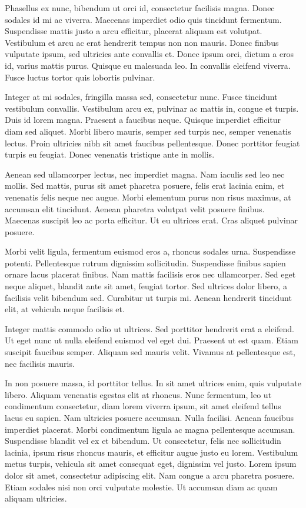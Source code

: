 Phasellus ex nunc, bibendum ut orci id, consectetur facilisis magna. Donec sodales id mi ac viverra. Maecenas imperdiet odio quis tincidunt fermentum. Suspendisse mattis justo a arcu efficitur, placerat aliquam est volutpat. Vestibulum et arcu ac erat hendrerit tempus non non mauris. Donec finibus vulputate ipsum, sed ultricies ante convallis et. Donec ipsum orci, dictum a eros id, varius mattis purus. Quisque eu malesuada leo. In convallis eleifend viverra. Fusce luctus tortor quis lobortis pulvinar.

Integer at mi sodales, fringilla massa sed, consectetur nunc. Fusce tincidunt vestibulum convallis. Vestibulum arcu ex, pulvinar ac mattis in, congue et turpis. Duis id lorem magna. Praesent a faucibus neque. Quisque imperdiet efficitur diam sed aliquet. Morbi libero mauris, semper sed turpis nec, semper venenatis lectus. Proin ultricies nibh sit amet faucibus pellentesque. Donec porttitor feugiat turpis eu feugiat. Donec venenatis tristique ante in mollis.

Aenean sed ullamcorper lectus, nec imperdiet magna. Nam iaculis sed leo nec mollis. Sed mattis, purus sit amet pharetra posuere, felis erat lacinia enim, et venenatis felis neque nec augue. Morbi elementum purus non risus maximus, at accumsan elit tincidunt. Aenean pharetra volutpat velit posuere finibus. Maecenas suscipit leo ac porta efficitur. Ut eu ultrices erat. Cras aliquet pulvinar posuere.

Morbi velit ligula, fermentum euismod eros a, rhoncus sodales urna. Suspendisse potenti. Pellentesque rutrum dignissim sollicitudin. Suspendisse finibus sapien ornare lacus placerat finibus. Nam mattis facilisis eros nec ullamcorper. Sed eget neque aliquet, blandit ante sit amet, feugiat tortor. Sed ultrices dolor libero, a facilisis velit bibendum sed. Curabitur ut turpis mi. Aenean hendrerit tincidunt elit, at vehicula neque facilisis et.

Integer mattis commodo odio ut ultrices. Sed porttitor hendrerit erat a eleifend. Ut eget nunc ut nulla eleifend euismod vel eget dui. Praesent ut est quam. Etiam suscipit faucibus semper. Aliquam sed mauris velit. Vivamus at pellentesque est, nec facilisis mauris.

In non posuere massa, id porttitor tellus. In sit amet ultrices enim, quis vulputate libero. Aliquam venenatis egestas elit at rhoncus. Nunc fermentum, leo ut condimentum consectetur, diam lorem viverra ipsum, sit amet eleifend tellus lacus eu sapien. Nam ultricies posuere accumsan. Nulla facilisi. Aenean faucibus imperdiet placerat. Morbi condimentum ligula ac magna pellentesque accumsan. Suspendisse blandit vel ex et bibendum. Ut consectetur, felis nec sollicitudin lacinia, ipsum risus rhoncus mauris, et efficitur augue justo eu lorem. Vestibulum metus turpis, vehicula sit amet consequat eget, dignissim vel justo. Lorem ipsum dolor sit amet, consectetur adipiscing elit. Nam congue a arcu pharetra posuere. Etiam sodales nisi non orci vulputate molestie. Ut accumsan diam ac quam aliquam ultricies.

